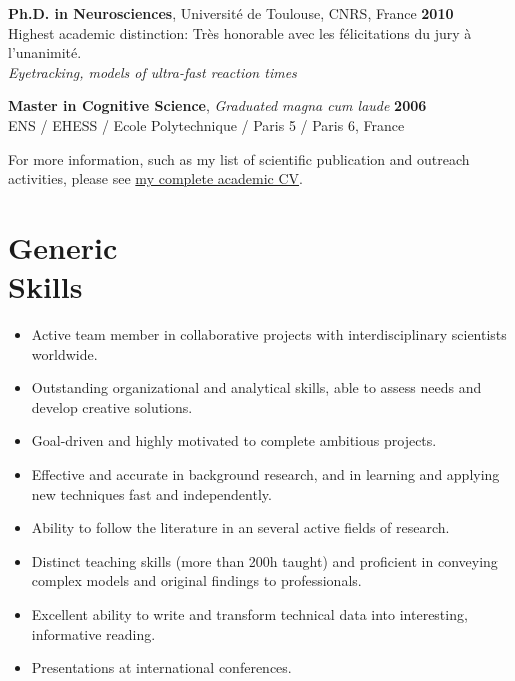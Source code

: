\documentclass[margin,line]{resume}
\begin{document}
\begin{resume}
	\vspace{-1.5mm}	
         \textbf{Ph.D. in Neurosciences}, Université de Toulouse, CNRS, France \hfill \textbf{2010}\\
	Highest academic distinction: Très honorable avec les félicitations du jury à l'unanimité.\\
	\textsl{Eyetracking, models of ultra-fast reaction times}
	
	\vspace{-1.5mm}
	\textbf{Master in Cognitive Science}, \textsl{Graduated magna cum laude} \hfill \textbf{2006}\\
	ENS / EHESS / Ecole Polytechnique / Paris 5 / Paris 6, France
	
	\vspace{-1.5mm}
	For more information, such as my list of scientific publication and outreach activities, please see \href{http://scrouzet.github.io/cv/CVSebastienCrouzet.pdf}{my complete academic CV}.



    \vspace{3mm}
    \section{\mysidestyle Generic \\Skills}
	\begin{itemize} \itemsep1pt \parskip0pt  \leftmargin=0em \itemindent=0em
  		\item Active team member in collaborative projects with interdisciplinary scientists worldwide.
  		\item Outstanding organizational and analytical skills, able to assess needs and develop creative solutions.
  		\item Goal-driven and highly motivated to complete ambitious projects.
  		\item Effective and accurate in background research, and in learning and applying new techniques fast and independently.
  		\item Ability to follow the literature in an several active fields of research.
  		\item Distinct teaching skills (more than 200h taught) and proficient in conveying complex models and original findings to professionals.
  		\item Excellent ability to write and transform technical data into interesting, informative reading.
  		\item Presentations at international conferences.


\end{itemize}
\end{resume}
\end{document}
